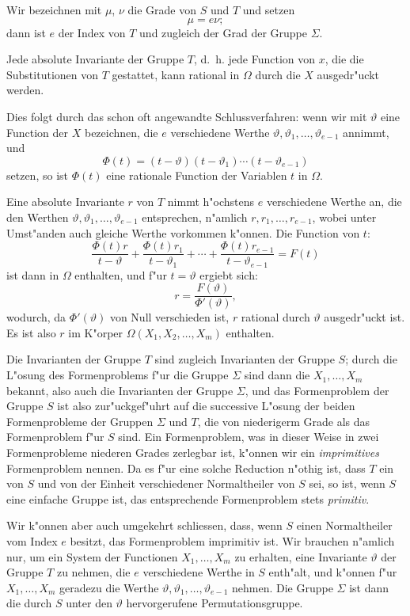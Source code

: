 \documentclass[12pt,a4paper]{article}
\theoremstyle{definition}
\begin{document}
Wir bezeichnen mit $\mu$, $\nu$ die Grade von $S$ und $T$ und setzen
\[
\mu = e\nu;
\]
dann ist $e$ der Index von $T$ und zugleich der Grad der Gruppe $\Sigma$.

Jede absolute Invariante der Gruppe $T$, d.~h. jede Function von $x$, die die Substitutionen von $T$ gestattet, kann rational in $\Omega$ durch die $X$ ausgedr"uckt werden.

Dies folgt durch das schon oft angewandte Schlussverfahren: wenn wir mit $\vartheta$ eine Function der $X$ bezeichnen, die $e$ verschiedene Werthe $\vartheta, \vartheta_1, \ldots, \vartheta_{e-1}$ annimmt, und
\begin{equation}\label{eq:46-2}
\Phi(t) = (t - \vartheta)(t - \vartheta_1) \cdots (t - \vartheta_{e-1})
\end{equation}
setzen, so ist $\Phi(t)$ eine rationale Function der Variablen $t$ in $\Omega$.

Eine absolute Invariante $r$ von $T$ nimmt h"ochstens $e$ verschiedene Werthe an, die den Werthen $\vartheta, \vartheta_1, \ldots, \vartheta_{e-1}$ entsprechen, n"amlich $r, r_1, \ldots, r_{e-1}$, wobei unter Umst"anden auch gleiche Werthe vorkommen k"onnen. Die Function von $t$:
\[
\frac{\Phi(t)r}{t - \vartheta} + \frac{\Phi(t)r_1}{t - \vartheta_1} + \cdots + \frac{\Phi(t)r_{e-1}}{t - \vartheta_{e-1}} = F(t)
\]
ist dann in $\Omega$ enthalten, und f"ur $t = \vartheta$ ergiebt sich:
\[
r = \frac{F(\vartheta)}{\Phi'(\vartheta)},
\]
wodurch, da $\Phi'(\vartheta)$ von Null verschieden ist, $r$ rational durch $\vartheta$ ausgedr"uckt ist. Es ist also $r$ im K"orper $\Omega(X_1, X_2, \ldots, X_m)$ enthalten.

Die Invarianten der Gruppe $T$ sind zugleich Invarianten der Gruppe $S$; durch die L"osung des Formenproblems f"ur die Gruppe $\Sigma$ sind dann die $X_1, \ldots, X_m$ bekannt, also auch die Invarianten der Gruppe $\Sigma$, und das Formenproblem der Gruppe $S$ ist also zur"uckgef"uhrt auf die successive L"osung der beiden Formenprobleme der Gruppen $\Sigma$ und $T$, die von niederigerm Grade als das Formenproblem f"ur $S$ sind. Ein Formenproblem, was in dieser Weise in zwei Formenprobleme niederen Grades zerlegbar ist, k"onnen wir ein \emph{imprimitives} Formenproblem nennen. Da es f"ur eine solche Reduction n"othig ist, dass $T$ ein von $S$ und von der Einheit verschiedener Normaltheiler von $S$ sei, so ist, wenn $S$ eine einfache Gruppe ist, das entsprechende Formenproblem stets \emph{primitiv}.

Wir k"onnen aber auch umgekehrt schliessen, dass, wenn $S$ einen Normaltheiler vom Index $e$ besitzt, das Formenproblem imprimitiv ist. Wir brauchen n"amlich nur, um ein System der Functionen $X_1, \ldots, X_m$ zu erhalten, eine Invariante $\vartheta$ der Gruppe $T$ zu nehmen, die $e$ verschiedene Werthe in $S$ enth"alt, und k"onnen f"ur $X_1, \ldots, X_m$ geradezu die Werthe $\vartheta, \vartheta_1, \ldots, \vartheta_{e-1}$ nehmen. Die Gruppe $\Sigma$ ist dann die durch $S$ unter den $\vartheta$ hervorgerufene Permutationsgruppe.
\end{document}
